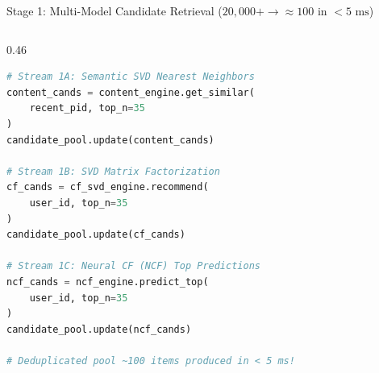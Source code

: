 \documentclass[10pt]{beamer}
\begin{document}
\begin{frame}[fragile]{Stage 1: Multi-Model Candidate Retrieval ($20,000+ \to \approx 100$ in $<5\text{ ms}$)}
\begin{columns}[T]
\begin{column}{0.46\textwidth}
\begin{lstlisting}[language=Python]
# Stream 1A: Semantic SVD Nearest Neighbors
content_cands = content_engine.get_similar(
    recent_pid, top_n=35
)
candidate_pool.update(content_cands)

# Stream 1B: SVD Matrix Factorization
cf_cands = cf_svd_engine.recommend(
    user_id, top_n=35
)
candidate_pool.update(cf_cands)

# Stream 1C: Neural CF (NCF) Top Predictions
ncf_cands = ncf_engine.predict_top(
    user_id, top_n=35
)
candidate_pool.update(ncf_cands)

# Deduplicated pool ~100 items produced in < 5 ms!
\end{lstlisting}
    \end{column}
\end{columns}
\end{frame}

\end{document}
